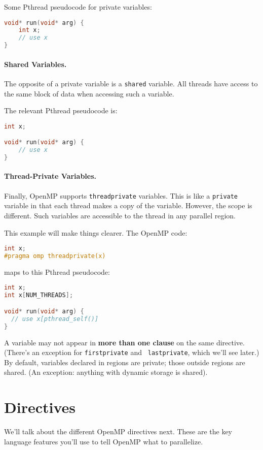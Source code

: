 Some Pthread pseudocode for private variables:

  \begin{lstlisting}[language=C]
void* run(void* arg) {
    int x;
    // use x
}
  \end{lstlisting}

\paragraph{Shared Variables.} The opposite of a private variable
is a {\tt shared} variable. All threads have access to the same block
of data when accessing such a variable.

The relevant Pthread pseudocode is:
  \begin{lstlisting}[language=C]
int x;

void* run(void* arg) {
    // use x
}
  \end{lstlisting}

\paragraph{Thread-Private Variables.} Finally, OpenMP supports 
{\tt threadprivate} variables. This is like a {\tt private} variable
in that each thread makes a copy of the variable. However, the scope 
is different. Such variables are accessible to the thread in any parallel region.

This example will make things clearer. The OpenMP code:
  \begin{lstlisting}[language=C]
int x;
#pragma omp threadprivate(x)
  \end{lstlisting}
  maps to this Pthread pseudocode:
  \begin{lstlisting}[language=C]
int x;
int x[NUM_THREADS];

void* run(void* arg) {
  // use x[pthread_self()]
}
  \end{lstlisting}

A variable may not appear in {\bf more than one clause} on the same
directive. (There's an exception for {\tt firstprivate} and {\tt
  lastprivate}, which we'll see later.) By default, variables
declared in regions are private; those outside regions are
shared. (An exception: anything with dynamic storage is
shared).

\section*{Directives}
We'll talk about the different OpenMP directives next. These are the key
language features you'll use to tell OpenMP what to parallelize.

